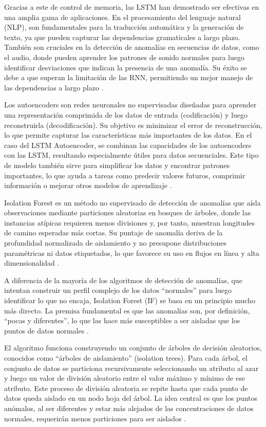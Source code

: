 Gracias a este de control de memoria, las LSTM han demostrado ser efectivas en una amplia gama de aplicaciones. En el procesamiento del lenguaje natural (NLP), son fundamentales para la traducción automática y la generación de texto, ya que pueden capturar las dependencias gramaticales a largo plazo. También son cruciales en la detección de anomalías en secuencias de datos, como el audio, donde pueden aprender los patrones de sonido normales para luego identificar desviaciones que indican la presencia de una anomalía. Su éxito se debe a que superan la limitación de las RNN, permitiendo un mejor manejo de las dependencias a largo plazo \cite{hochreiter1997long}.

Los autoencoders son redes neuronales no supervisadas diseñadas para aprender una representación comprimida de los datos de entrada (codificación) y luego reconstruirla (decodificación). Su objetivo es minimizar el error de reconstrucción, lo que permite capturar las características más importantes de los datos. En el caso del LSTM Autoencoder, se combinan las capacidades de los autoencoders con las LSTM, resultando especialmente útiles para datos secuenciales. Este tipo de modelo también sirve para simplificar los datos y encontrar patrones importantes, lo que ayuda a tareas como predecir valores futuros, comprimir información o mejorar otros modelos de aprendizaje \cite{malhotra2015long}.

Isolation Forest es un método no supervisado de detección de anomalías que aísla observaciones mediante particiones aleatorias en bosques de árboles, donde las instancias atípicas requieren menos divisiones y, por tanto, muestran longitudes de camino esperadas más cortas. Su puntaje de anomalía deriva de la profundidad normalizada de aislamiento y no presupone distribuciones paramétricas ni datos etiquetados, lo que favorece su uso en flujos en línea y alta dimensionalidad \cite{aggarwal2016introduction}. 

A diferencia de la mayoría de los algoritmos de detección de anomalías, que intentan construir un perfil complejo de los datos ``normales'' para luego identificar lo que no encaja, Isolation Forest (IF) se basa en un principio mucho más directo. La premisa fundamental es que las anomalías son, por definición, ``pocas y diferentes'', lo que las hace más susceptibles a ser aisladas que los puntos de datos normales \cite{liu2012isolation}.

El algoritmo funciona construyendo un conjunto de árboles de decisión aleatorios, conocidos como ``árboles de aislamiento'' (isolation trees). Para cada árbol, el conjunto de datos se particiona recursivamente seleccionando un atributo al azar y luego un valor de división aleatorio entre el valor máximo y mínimo de ese atributo. Este proceso de división aleatoria se repite hasta que cada punto de datos queda aislado en un nodo hoja del árbol. La idea central es que los puntos anómalos, al ser diferentes y estar más alejados de las concentraciones de datos normales, requerirán menos particiones para ser aislados \cite{liu2012isolation}.

